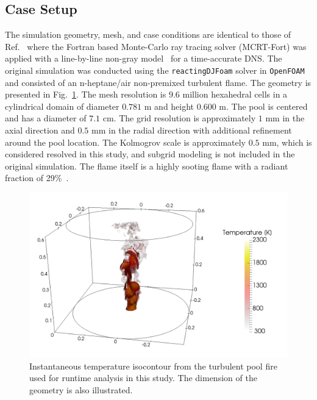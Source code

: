 \subsection{Case Setup}
The simulation geometry, mesh, and case conditions are identical to those of Ref.~\cite{Wu2020DetailedFire} where the Fortran based Monte-Carlo ray tracing solver (MCRT-Fort) was applied with a line-by-line non-gray model~\cite{Ren2019Line-by-lineSystem} for a time-accurate DNS. The original simulation was conducted using the \texttt{reactingDJFoam} solver in \texttt{OpenFOAM}~\cite{Wu2019AFlame} and consisted of an n-heptane/air non-premixed turbulent flame. The geometry is presented in Fig.~\ref{fig:PoolFireVisual}. The mesh resolution is $9.6$ million hexahedral cells in a cylindrical domain of diameter $0.781$ m and height $0.600$ m. The pool is centered and has a diameter of $7.1$ cm. The grid resolution is approximately $1$ mm in the axial direction and $0.5$ mm in the radial direction with additional refinement around the pool location. The Kolmogrov scale is approximately $0.5$ mm, which is considered resolved in this study, and subgrid modeling is not included in the original simulation. 
The flame itself is a highly sooting flame with a radiant fraction of 29\%~\cite{Wu2020DetailedFire}. 


\begin{figure}[!b]
\centering
\includegraphics[width=0.8\linewidth]{figures/ch4/PoolFireVisual.png}
\caption{Instantaneous temperature isocontour from the turbulent pool fire used for runtime analysis in this study. The dimension of the geometry is also illustrated.}
\label{fig:PoolFireVisual}
\end{figure}


